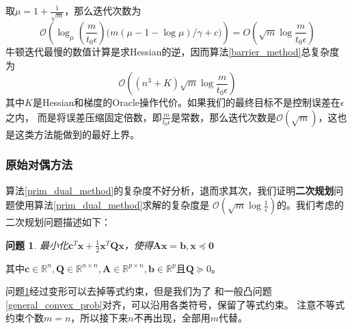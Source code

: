 \documentclass{article}
\newtheorem{problem}{问题}
\begin{document}
取$\mu=1+\frac{1}{\sqrt{m}}$，那么迭代次数为
$$\mathcal O(\log_\mu(\frac{m}{t_0\epsilon})\Big(m(\mu-1-\log\mu)/\gamma+c\Big))=O(\sqrt m\log \frac{m}{t_0\epsilon})$$
牛顿迭代最慢的数值计算是求Hessian的逆，因而算法\ref{barrier_method}总复杂度
为$$\mathcal O((n^3+K)\sqrt m\log \frac{m}{t_0\epsilon})$$
其中$K$是Hessian和梯度的Oracle操作代价。如果我们的最终目标不是控制误差在$\epsilon$之内，
而是将误差压缩固定倍数，即$\frac{m}{t_0\epsilon}$是常数，那么迭代次数是$\mathcal O(\sqrt m)$，这也是这类方法能做到的最好上界。
\label{time_complexity_barrier}
\subsubsection{原始对偶方法}
算法\ref{prim_dual_method}的复杂度不好分析，退而求其次，我们证明\textbf{二次规划}问题使用算法\ref{prim_dual_method}求解的复杂度是
$\mathcal O(\sqrt{m}\log\frac{1}{\epsilon})$的。我们考虑的二次规划问题描述如下：
\begin{problem}
    \label{quad_problem}
    最小化$\bm c^T\bm x+\frac{1}{2}\bm x^T\bm Q\bm x$，使得$\bm A\bm x=\bm b,\bm x\preceq \bm 0$
\end{problem}
其中$\bm c\in \mathbb{R}^n,\bm Q\in \mathbb{R}^{n\times n},\bm A\in\mathbb{R}^{p\times n},\bm b\in \mathbb{R}^p$且$\bm Q\succeq 0$。

问题\ref{quad_problem}经过变形可以去掉等式约束，但是我们为了
和一般凸问题\ref{general_convex_prob}对齐，可以沿用各类符号，保留了等式约束。
注意不等式约束个数$m=n$，所以接下来$n$不再出现，全部用$m$代替。
\end{document}
